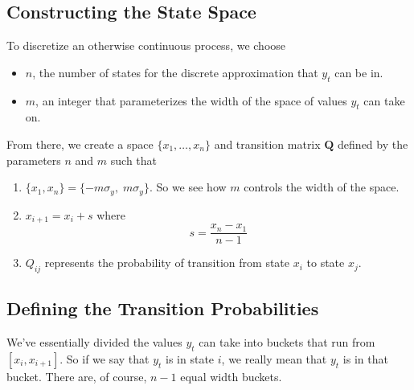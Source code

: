 \documentclass[a4paper,12pt]{scrartcl}
\begin{document}
\subsection{Constructing the State Space}
To discretize an otherwise continuous process, we choose
\begin{itemize}
    \item $n$, the number of states for the discrete 
	approximation that $y_t$ can be in.
    \item $m$, an integer that parameterizes the width of
	the space of values $y_t$ can take on.
\end{itemize}
From there, we create a space $\{x_1, \ldots, x_n\}$ and
transition matrix $\mathbf{Q}$ defined
by the parameters $n$ and $m$ such that
\begin{enumerate}
    \item $\{ x_1, x_n \} = \{ -m \sigma_y, \; m \sigma_y \}$.
	So we see how $m$ controls the width of the space.
    \item $x_{i+1} = x_i + s$ where
	\[ s = \frac{x_n - x_1}{n-1} \]
    \item $Q_{ij}$ represents the probability of transition
	from state $x_i$ to state $x_j$. 
\end{enumerate}

\subsection{Defining the Transition Probabilities}

We've essentially divided the values $y_t$ can take into buckets
that run from $[x_i, x_{i+1}]$.  So if we say that $y_t$
is in state $i$, we really mean that $y_t$ is in that bucket.
There are, of course, $n-1$ equal width buckets.
\end{document}
